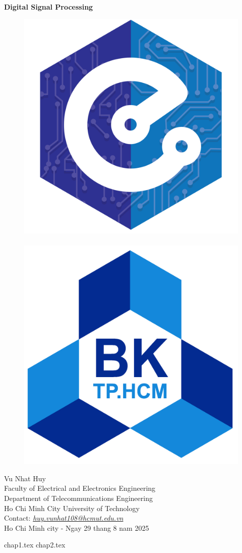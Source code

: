 \documentclass[11pt, a4paper]{article}
\begin{document}
\begin{titlepage}
    \centering
    \vspace*{1in}

    {\LARGE \bfseries Digital Signal Processing}\\[1.5cm]
    \begin{figure}[h!]
        \centering
        \includegraphics[width=0.2\linewidth]{EE.png} $\quad$
        \includegraphics[width=0.2\linewidth]{HCMUT.png}
    \end{figure}
    {\large Vu Nhat Huy}\\[0.5cm]
    {\large Faculty of Electrical and Electronics Engineering}\\
    {\large Department of Telecommunications Engineering}\\
    {\large Ho Chi Minh City University of Technology}\\
    {\large Contact: \href{mailto:huy.vunhat108@hcmut.edu.vn}{\it huy.vunhat108@hcmut.edu.vn}}\\[2cm]

    \vfill
    {\large Ho Chi Minh city - Ngay 29 thang 8 nam 2025}
\end{titlepage}
{
  \tableofcontents
  \thispagestyle{empty}
}
\newpage
\setcounter{page}{1}
{chap1.tex}
\newpage
{chap2.tex}
\end{document}
